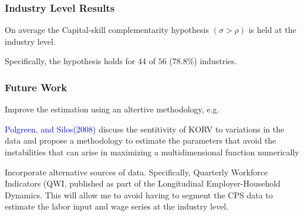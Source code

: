 \documentclass[notes,11pt, aspectratio=169]{beamer}
\newenvironment{wideitemize}{\itemize\addtolength{\itemsep}{10pt}}{\enditemize}
\begin{document}
\begin{frame}
 \frametitle{Industry Level Results}
 \begin{wideitemize}
 \item On average the Capital-skill complementarity hypothesis $(\sigma > \rho)$ is held at the industry level.
 \item Specifically, the hypothesis holds for $44$ of $56$ ($78.8\%$) industries.
 \end{wideitemize}
 \end{frame}

\begin{frame}
 \frametitle{Future Work}

 \begin{wideitemize}
 
 
 \item Improve the estimation using an altertive methodology, e.g. 
 \begin{wideitemize}
 \item \textcolor{blue}{Polgreen, and Silos(2008)} discuss the sentitivity of KORV to variations in the data and propose a methodology to estimate the parameters that avoid the instabilities that can arise in maximizing a multidimensional function numerically
 \end{wideitemize}
 
 \item Incorporate alternative sources of data. Specifically, Quarterly Workforce Indicators (QWI, published as part of the Longitudinal Employer-Household Dynamics. This will allow me to avoid having to segment the CPS data to estimate the labor input and wage series at the industry level. 
 \end{wideitemize}

\end{frame}

\end{document}
